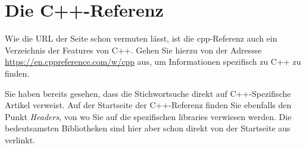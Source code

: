 \section{Die C++-Referenz}
\begin{plusbox}
Wie die URL der Seite schon vermuten lässt, ist die cpp-Referenz auch ein Verzeichnis der Features von C++. Gehen Sie hierzu von der Adressse \url{https://en.cppreference.com/w/cpp} aus, um Informationen spezifisch zu C++ zu finden.

Sie haben bereits gesehen, dass die Stichwortsuche direkt auf C++-Spezifische Artikel verweist. Auf der Startseite der C++-Referenz finden Sie ebenfalls den Punkt \emph{Headers}, von wo Sie auf die spezifischen libraries verwiesen werden. Die bedeutsamsten Bibliotheken sind hier aber schon direkt von der Startseite aus verlinkt.
\end{plusbox}